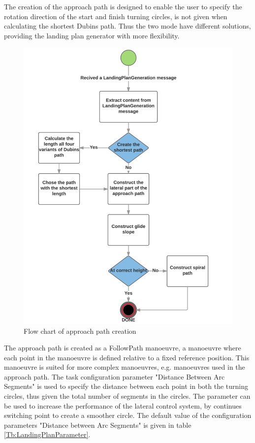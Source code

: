 The creation of the approach path is designed to enable the user to specify the rotation direction of the start and finish turning circles, is not given when calculating the shortest Dubins path. Thus the two mode have different solutions, providing the landing plan generator with more flexibility.
\begin{figure}[H]
\centering
\includegraphics[scale=0.8]{figs/ApproachPath.png}
\caption{Flow chart of approach path creation}
\label{Fig:FlowChartApproach}
\end{figure}
The approach path is created as a FollowPath manoeuvre, a manoeuvre where each point in the manoeuvre is defined relative to a fixed reference position. This manoeuvre is suited for more complex manoeuvres, e.g. manoeuvres used in the approach path. The task configuration parameter "Distance Between Arc Segments" is used to specify the distance between each point in both the turning circles, thus given the total number of segments in the circles. The parameter can be used to increase the performance of the lateral control system, by continues switching point to create a smoother circle. The default value of the configuration parameters "Distance between Arc Segments" is given in table \ref{Tb:LandingPlanParameter}.

